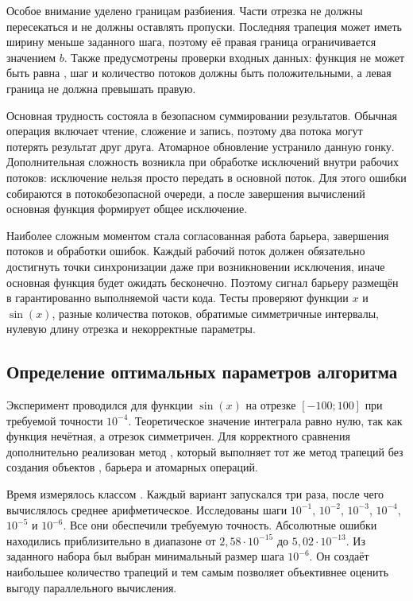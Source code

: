 Особое внимание уделено границам разбиения. Части отрезка не должны пересекаться и не должны оставлять пропуски. Последняя трапеция может иметь ширину меньше заданного шага, поэтому её правая граница ограничивается значением $b$. Также предусмотрены проверки входных данных: функция не может быть равна , шаг и количество потоков должны быть положительными, а левая граница не должна превышать правую.

Основная трудность состояла в безопасном суммировании результатов. Обычная операция  включает чтение, сложение и запись, поэтому два потока могут потерять результат друг друга. Атомарное обновление устранило данную гонку. Дополнительная сложность возникла при обработке исключений внутри рабочих потоков: исключение нельзя просто передать в основной поток. Для этого ошибки собираются в потокобезопасной очереди, а после завершения вычислений основная функция формирует общее исключение.

Наиболее сложным моментом стала согласованная работа барьера, завершения потоков и обработки ошибок. Каждый рабочий поток должен обязательно достигнуть точки синхронизации даже при возникновении исключения, иначе основная функция будет ожидать бесконечно. Поэтому сигнал барьеру размещён в гарантированно выполняемой части кода. Тесты проверяют функции $x$ и $\sin(x)$, разные количества потоков, обратимые симметричные интервалы, нулевую длину отрезка и некорректные параметры.

\subsection{Определение оптимальных параметров алгоритма}

Эксперимент проводился для функции $\sin(x)$ на отрезке $[-100;100]$ при требуемой точности $10^{-4}$. Теоретическое значение интеграла равно нулю, так как функция нечётная, а отрезок симметричен. Для корректного сравнения дополнительно реализован метод , который выполняет тот же метод трапеций без создания объектов , барьера и атомарных операций.

Время измерялось классом  \cite{stopwatch}. Каждый вариант запускался три раза, после чего вычислялось среднее арифметическое. Исследованы шаги $10^{-1}$, $10^{-2}$, $10^{-3}$, $10^{-4}$, $10^{-5}$ и $10^{-6}$. Все они обеспечили требуемую точность. Абсолютные ошибки находились приблизительно в диапазоне от $2{,}58\cdot10^{-15}$ до $5{,}02\cdot10^{-13}$. Из заданного набора был выбран минимальный размер шага $10^{-6}$. Он создаёт наибольшее количество трапеций и тем самым позволяет объективнее оценить выгоду параллельного вычисления.

